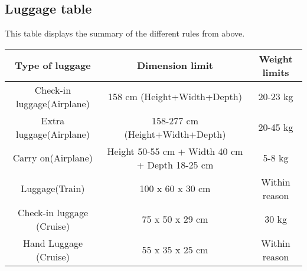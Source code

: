 \subsection*{Luggage table}
This table displays the summary of the different rules from above.

\begin{table}[H]
\begin{center}
\begin{tabular}{| c | c | c |}
\hline
Type of luggage &  Dimension limit & Weight limits \\ \hline
Check-in luggage(Airplane) & 158 cm (Height+Width+Depth) & 20-23 kg \\ \hline
Extra luggage(Airplane) & 158-277 cm (Height+Width+Depth) &  20-45 kg \\ \hline
Carry on(Airplane) & Height 50-55 cm + Width 40 cm + Depth 18-25 cm & 5-8 kg \\ \hline
Luggage(Train) & 100 x 60 x 30 cm & Within reason \\ \hline
Check-in luggage (Cruise) & 75 x 50 x 29 cm & 30 kg \\ \hline
Hand Luggage (Cruise) & 55 x 35 x 25 cm & Within reason \\ \hline
\end{tabular}
\end{center}
\end{table}